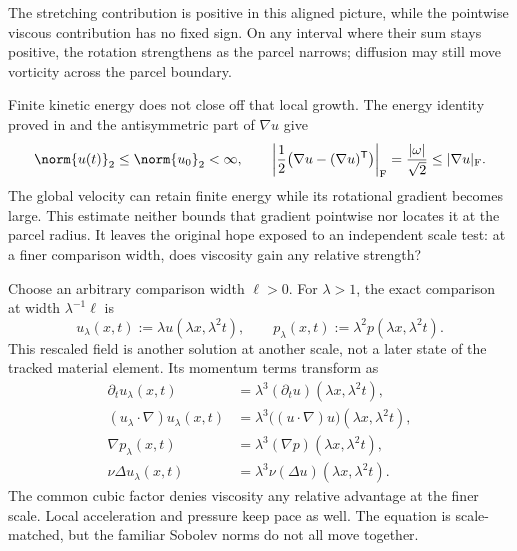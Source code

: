 The stretching contribution is positive in this aligned picture, while the pointwise viscous contribution has no fixed sign. On any interval where their sum stays positive, the rotation strengthens as the parcel narrows; diffusion may still move vorticity across the parcel boundary.

Finite kinetic energy does not close off that local growth. The energy identity proved in  and the antisymmetric part of \(\nabla u\) give
\[
  \norm{u(t)}_2
  \leq
  \norm{u_0}_2
  <\infty,
  \qquad
  \left|\frac12\bigl(\nabla u-(\nabla u)^{\mathsf T}\bigr)\right|_{\mathrm F}
  =
  \frac{|\omega|}{\sqrt2}
  \leq
  |\nabla u|_{\mathrm F}.
\]
The global velocity can retain finite energy while its rotational gradient becomes large. This estimate neither bounds that gradient pointwise nor locates it at the parcel radius. It leaves the original hope exposed to an independent scale test: at a finer comparison width, does viscosity gain any relative strength?


Choose an arbitrary comparison width \(\ell>0\). For \(\lambda>1\), the exact \NavierStokes{} comparison at width \(\lambda^{-1}\ell\) is
\[
  u_\lambda(x,t)
  :=
  \lambda u(\lambda x,\lambda^2t),
  \qquad
  p_\lambda(x,t)
  :=
  \lambda^2p(\lambda x,\lambda^2t).
\]
This rescaled field is another solution at another scale, not a later state of the tracked material element. Its momentum terms transform as
\[
\begin{aligned}
  \partial_tu_\lambda(x,t)
  &=
  \lambda^3(\partial_tu)(\lambda x,\lambda^2t),
  \\
  (u_\lambda\cdot\nabla)u_\lambda(x,t)
  &=
  \lambda^3\bigl((u\cdot\nabla)u\bigr)(\lambda x,\lambda^2t),
  \\
  \nabla p_\lambda(x,t)
  &=
  \lambda^3(\nabla p)(\lambda x,\lambda^2t),
  \\
  \nu\Delta u_\lambda(x,t)
  &=
  \lambda^3\nu(\Delta u)(\lambda x,\lambda^2t).
\end{aligned}
\]
The common cubic factor denies viscosity any relative advantage at the finer scale. Local acceleration and pressure keep pace as well. The equation is scale-matched, but the familiar Sobolev norms do not all move together.


